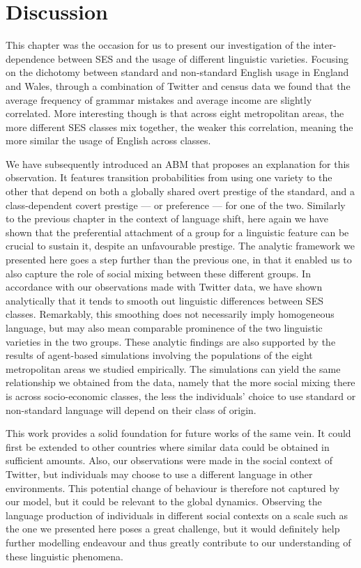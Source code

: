 \documentclass[../thesis.tex]{subfiles}
\begin{document}
\section{Discussion}
This chapter was the occasion for us to present our investigation of the inter-dependence between \ac{SES} and the usage of different linguistic varieties.
Focusing on the dichotomy between standard and non-standard English usage in England and Wales, through a combination of Twitter and census data we found that the average frequency of grammar mistakes and average income are slightly correlated.
More interesting though is that across eight metropolitan areas, the more different \ac{SES} classes mix together, the weaker this correlation, meaning the more similar the usage of English across classes.

We have subsequently introduced an \ac{ABM} that proposes an explanation for this observation.
It features transition probabilities from using one variety to the other that depend on both a globally shared overt prestige of the standard, and a class-dependent covert prestige --- or preference --- for one of the two.
Similarly to the previous chapter in the context of language shift, here again we have shown that the preferential attachment of a group for a linguistic feature can be crucial to sustain it, despite an unfavourable prestige.
The analytic framework we presented here goes a step further than the previous one, in that it enabled us to also capture the role of social mixing between these different groups.
In accordance with our observations made with Twitter data, we have shown analytically that it tends to smooth out linguistic differences between \ac{SES} classes.
Remarkably, this smoothing does not necessarily imply homogeneous language, but may also mean comparable prominence of the two linguistic varieties in the two groups.
These analytic findings are also supported by the results of agent-based simulations involving the populations of the eight metropolitan areas we studied empirically.
The simulations can yield the same relationship we obtained from the data, namely that the more social mixing there is across socio-economic classes, the less the individuals' choice to use standard or non-standard language will depend on their class of origin.

This work provides a solid foundation for future works of the same vein.
It could first be extended to other countries where similar data could be obtained in sufficient amounts.
Also, our observations were made in the social context of Twitter, but individuals may choose to use a different language in other environments.
This potential change of behaviour is therefore not captured by our model, but it could be relevant to the global dynamics.
Observing the language production of individuals in different social contexts on a scale such as the one we presented here poses a great challenge, but it would definitely help further modelling endeavour and thus greatly contribute to our understanding of these linguistic phenomena.
\end{document}

